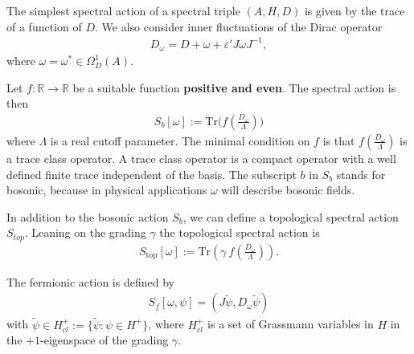 The simplest spectral action of a spectral triple $(A, H, D)$ is given by the
trace of a function of $D$. We also consider inner fluctuations of the Dirac
operator
\begin{align}
    D_\omega = D + \omega + \varepsilon' J\omega J^{-1},
\end{align}
where $\omega = \omega ^* \in \Omega_D^1(A)$.
\begin{mydefinition}
    Let $f:\mathbb{R} \rightarrow \mathbb{R}$ be a suitable function
    \textbf{positive and even}. The spectral action is then
    \begin{align}
        S_b [\omega] := \text{Tr}\big(f(\frac{D_\omega}{\Lambda})\big)
    \end{align}
    where $\Lambda$ is a real cutoff parameter. The minimal condition on $f$
    is that $f(\frac{D_\omega}{\Lambda})$ is  a trace class operator. A trace
    class operator is a compact operator with a well defined finite trace
    independent of the basis. The subscript $b$ in $S_b$ stands for bosonic,
    because in physical applications $\omega$ will describe bosonic fields.

    In addition to the bosonic action $S_b$, we can define a topological spectral
    action $S_{top}$. Leaning on the grading $\gamma$ the topological spectral action is
    \begin{align}
        S_{\text{top}}[\omega] := \text{Tr}(\gamma\
        f(\frac{D_\omega}{\Lambda})).
    \end{align}
\end{mydefinition}
\begin{mydefinition}\label{def:fermionic action}
    The fermionic action is defined by
    \begin{align}
        S_f[\omega, \psi] = (J\tilde{\psi}, D_\omega \tilde{\psi})
    \end{align}
    with $\tilde{\psi} \in H_{cl}^+ := \{\tilde{\psi}: \psi \in H^+\}$, where
    $H_{cl}^+$ is a set of Grassmann variables in $H$ in the $+1$-eigenspace
    of the grading $\gamma$.
\end{mydefinition}

